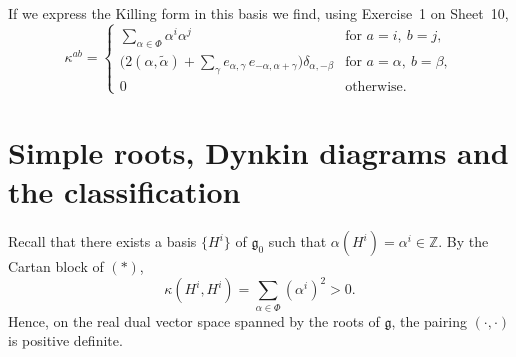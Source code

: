 If we express the Killing form in this basis we find, using Exercise~1 on Sheet~10,
\begin{equation*}
    \kappa^{ab} =
    \begin{cases}
        \displaystyle\sum_{\alpha \in \Phi} \alpha^i \alpha^j
            & \text{for } a = i,\ b = j, \\[2ex]
        \Big( 2(\alpha, \tilde{\alpha}) + \sum_\gamma e_{\alpha,\gamma}\, e_{-\alpha,\alpha+\gamma} \Big)
            \delta_{\alpha,-\beta}
            & \text{for } a = \alpha,\ b = \beta, \\[1ex]
        0 & \text{otherwise.}
    \end{cases}
    \tag{$*$}
\end{equation*}


\section{Simple roots, Dynkin diagrams and the classification}

Recall that there exists a basis $\{H^i\}$ of $\mathfrak{g}_0$ such that
$\alpha(H^i) = \alpha^i \in \mathbb{Z}$. By the Cartan block of $(*)$,
\[
    \kappa(H^i, H^i) = \sum_{\alpha \in \Phi} (\alpha^i)^2 > 0.
\]
Hence, on the real dual vector space spanned by the roots of $\mathfrak{g}$, the pairing
$(\cdot,\cdot)$ is positive definite.


